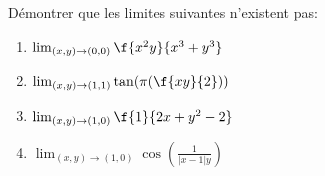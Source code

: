 
\begin{exercice}\label{exo0029}

Démontrer que les limites suivantes n'existent pas:
\begin{enumerate}
	\item $\lim_{(x,y)\rightarrow (0,0)} \f{x^2y}{x^3+y^3} $
	\item $\lim_{(x,y)\rightarrow (1,1)}  \tan(\pi(\f{xy}{2}))$
	\item $\lim_{(x,y)\rightarrow (1,0)}  \f{1}{2x+y^2-2} $
	\item $\lim_{(x,y)\rightarrow (1,0)} \cos \left( \frac{1}{|x-1|y}\right)$
\end{enumerate}

\end{exercice}
